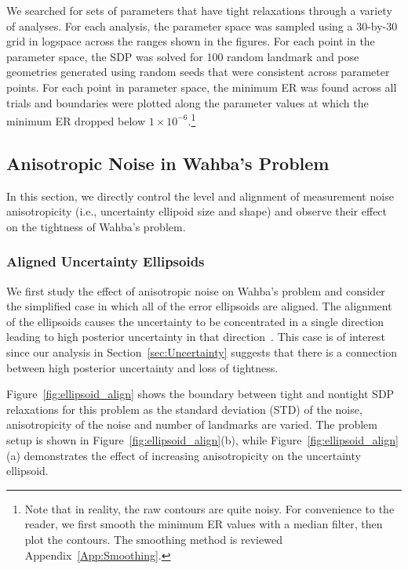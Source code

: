 \documentclass[lettersize,journal]{IEEEtran}
\begin{document}
We searched for sets of parameters that have tight relaxations through a variety of analyses. For each analysis, the parameter space was sampled using a 30-by-30 grid in logspace across the ranges shown in the figures. For each point in the parameter space, the SDP was solved for 100 random landmark and pose geometries generated using random seeds that were consistent across parameter points. For each point in parameter space, the minimum ER was found across all trials and boundaries were plotted along the parameter values at which the minimum ER dropped below $1\times10^{-6}$.\footnote{Note that in reality, the raw contours are quite noisy. For convenience to the reader, we first smooth the minimum ER values with a median filter, then plot the contours. The smoothing method is reviewed Appendix~\ref{App:Smoothing}.}

\subsection{Anisotropic Noise in Wahba's Problem}\label{sec:NoiseAnalysis}

In this section, we directly control the level and alignment of measurement noise anisotropicity (i.e., uncertainty ellipoid size and shape) and observe their effect on the tightness of Wahba's problem. 

\subsubsection{Aligned Uncertainty Ellipsoids}

We first study the effect of anisotropic noise  on Wahba's problem and consider the simplified case in which all of the error ellipsoids are aligned. The alignment of the ellipsoids causes the uncertainty to be concentrated in a single direction leading to high posterior uncertainty in that direction~\cite{zhangDegeneracyOptimizationbasedState2016}. This case is of interest since our analysis in Section~\ref{sec:Uncertainty} suggests that there is a connection between high posterior uncertainty and loss of tightness. 

Figure~\ref{fig:ellipsoid_align} shows the boundary between tight and nontight SDP relaxations for this problem as the standard deviation (STD) of the noise, anisotropicity of the noise  and number of landmarks are varied. The problem setup is shown in Figure~\ref{fig:ellipsoid_align}(b), while Figure~\ref{fig:ellipsoid_align}(a) demonstrates the effect of increasing anisotropicity on the uncertainty ellipsoid.
\end{document}
